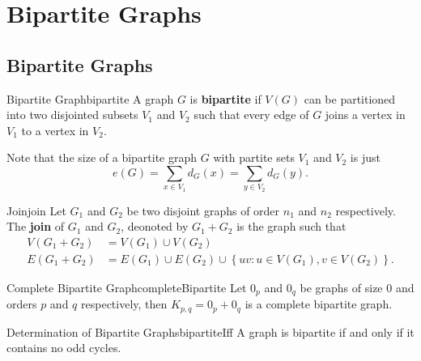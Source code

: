 \documentclass[math]{amznotes}
\theoremstyle{remark}
\begin{document}
\chapter{Bipartite Graphs}
\section{Bipartite Graphs}
\begin{dfnbox}{Bipartite Graph}{bipartite}
    A graph $G$ is {\color{red} \textbf{bipartite}} if $V(G)$ can be partitioned into two disjointed subsets $V_1$ and $V_2$ such that every edge of $G$ joins a vertex in $V_1$ to a vertex in $V_2$.
\end{dfnbox}
Note that the size of a bipartite graph $G$ with partite sets $V_1$ and $V_2$ is just
\begin{equation*}
    e(G) = \sum_{x \in V_1}d_G(x) = \sum_{y \in V_2}d_G(y).
\end{equation*}
\begin{dfnbox}{Join}{join}
    Let $G_1$ and $G_2$ be two disjoint graphs of order $n_1$ and $n_2$ respectively. The {\color{red} \textbf{join}} of $G_1$ and $G_2$, deonoted by $G_1 + G_2$ is the graph such that
    \begin{align*}
        V(G_1 + G_2) & = V(G_1) \cup V(G_2) \\
        E(G_1 + G_2) & = E(G_1) \cup E(G_2) \cup \left\{uv \colon u \in V(G_1), v \in V(G_2)\right\}.
    \end{align*}
\end{dfnbox}
\begin{thmbox}{Complete Bipartite Graph}{completeBipartite}
    Let $0_p$ and $0_q$ be graphs of size $0$ and orders $p$ and $q$ respectively, then $K_{p, q} = 0_p + 0_q$ is a complete bipartite graph.
\end{thmbox}
\begin{thmbox}{Determination of Bipartite Graphs}{bipartiteIff}
    A graph is bipartite if and only if it contains no odd cycles.
\end{thmbox}
\end{document}
